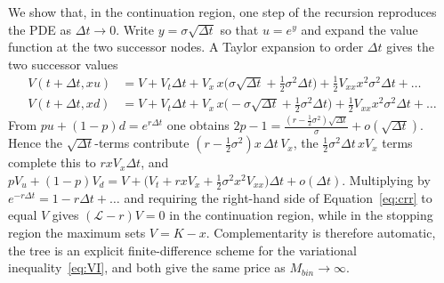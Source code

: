 We show that, in the continuation region, one step of the recursion reproduces the PDE as $\Delta t\to0$.
Write $y=\sigma\sqrt{\Delta t}$ so that $u=e^y$ and expand the value function at the two successor nodes.
A Taylor expansion to order $\Delta t$ gives the two successor values
\begin{align}
V(t+\Delta t,xu)&=V+V_t\Delta t+V_x\,x\big(\sigma\sqrt{\Delta t}+\tfrac12\sigma^2\Delta t\big)+\tfrac12V_{xx}x^2\sigma^2\Delta t+\dots\\
V(t+\Delta t,xd)&=V+V_t\Delta t+V_x\,x\big(-\sigma\sqrt{\Delta t}+\tfrac12\sigma^2\Delta t\big)+\tfrac12V_{xx}x^2\sigma^2\Delta t+\dots
\end{align}
From $pu+(1-p)d=e^{r\Delta t}$ one obtains $2p-1=\frac{(r-\frac12\sigma^2)\sqrt{\Delta t}}{\sigma}+o(\sqrt{\Delta t})$.
Hence the $\sqrt{\Delta t}$-terms contribute $(r-\tfrac12\sigma^2)x\,\Delta t\,V_x$, the $\tfrac12\sigma^2\Delta t\,xV_x$ terms complete this to $rxV_x\Delta t$, and $pV_u+(1-p)V_d=V+\big(V_t+rxV_x+\tfrac12\sigma^2x^2V_{xx}\big)\Delta t+o(\Delta t)$.
Multiplying by $e^{-r\Delta t}=1-r\Delta t+\dots$ and requiring the right-hand side of Equation~\eqref{eq:crr} to equal $V$ gives $(\mathcal L-r)V=0$ in the continuation region, while in the stopping region the maximum sets $V=K-x$.
Complementarity is therefore automatic, the tree is an explicit finite-difference scheme for the variational inequality~\eqref{eq:VI}, and both give the same price as $M_{bin}\to\infty$.
